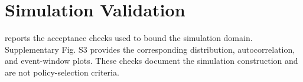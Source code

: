 \section{Simulation Validation}
\label{apx:generator_validation}

 reports the acceptance checks used to bound the
simulation domain. Supplementary Fig. S3 provides the corresponding
distribution, autocorrelation, and event-window plots. These checks document
the simulation construction and are not policy-selection criteria.

\begin{table}[htbp]
  \centering
  \caption{Simulation validation checks and acceptance criteria.}
  \label{tab:generator_validation}
  \small
  
\end{table}

\clearpage
